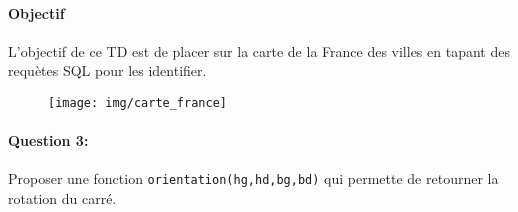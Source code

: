 

 


\paragraph{Objectif}

L'objectif de ce TD est de placer sur la carte de la France des villes en tapant des requètes SQL pour les identifier.

\begin{figure}[!ht]
\begin{center}
\texttt{[image: img/carte\_france]}
\end{center}
\end{figure}

\paragraph{Question 3:}

Proposer une fonction \verb?orientation(hg,hd,bg,bd)? qui permette de retourner la rotation du carré.

 
 
